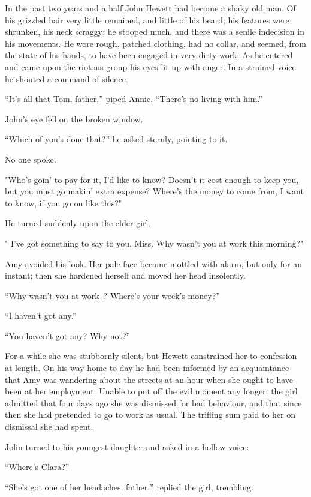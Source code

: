 In the past two years and a half John Hewett had become a shaky old man.
Of his grizzled hair very little remained, and little of his beard; his
features were shrunken, his neck scraggy; he stooped much, and there was
a senile indecision in his movements. He wore rough, patched clothing,
had no collar, and seemed, from the state of his hands, to have been
engaged in very dirty work. As he entered and came upon the riotous
group his eyes lit up with anger. In a strained voice he shouted a
command of silence.

``It's all that Tom, father,'' piped Annie. ``There's no living with
him.''

John's eye fell on the broken window.

``Which of you's done that?'' he asked sternly, pointing to it.

No one spoke.

"Who's goin' to pay for it, I'd like to know? Doesn't it cost enough to
keep you, {\protect\hypertarget{256}{}{}} but you must go makin' extra
expense? Where's the money to come from, I want to know, if you go on
like this?"

He turned suddenly upon the elder girl.

" I've got something to say to you, Miss. Why wasn't you at work this
morning?"

Amy avoided his look. Her pale face became mottled with alarm, but only
for an instant; then she hardened herself and moved her head insolently.

``Why wasn't you at work~? Where's your week's money?''

``I haven't got any.''

``You haven't got any? Why not?''

For a while she was stubbornly silent, but Hewett constrained her to
confession at length. On his way home to-day he had been informed by an
acquaintance that Amy was wandering about the streets at an hour when
she ought to have been at her employment. Unable to put off the evil
moment any longer, the girl admitted that four days ago she was
dismissed for bad behaviour, and that since then she had pretended to go
to work as usual. The trifling sum paid to her on dismissal she had
spent.

{\protect\hypertarget{257}{}{}} Jolin turned to his youngest daughter
and asked in a hollow voice:

``Where's Clara?''

``She's got one of her headaches, father,'' replied the girl, trembling.

